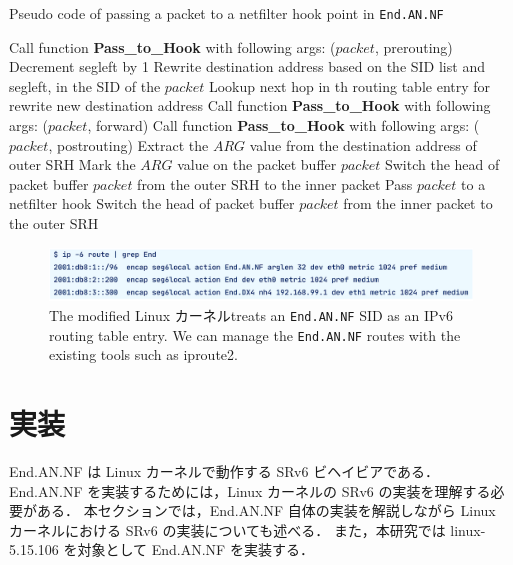   \begin{algorithm*}[t]
    \caption{Pseudo code of passing a packet to a netfilter hook point in \texttt{End.AN.NF}}
    \small
    \label{alg:end-an-nf}
    \begin{algorithmic}[1]
      \State Call function \textbf{Pass\_to\_Hook} with following args: ($packet$, prerouting)
      \State Decrement segleft by 1
      \State Rewrite destination address based on the SID list and segleft, in the SID of the $packet$
      \State Lookup next hop in th routing table entry for rewrite new destination address
      \State Call function \textbf{Pass\_to\_Hook} with following args: ($packet$, forward)
      \State Call function \textbf{Pass\_to\_Hook} with following args: ($packet$, postrouting)
      \EndFunction
      \fi
      \State Extract the $ARG$ value from the destination address of outer SRH
      \State Mark the $ARG$ value on the packet buffer $packet$
      \EndIf
      \State Switch the head of packet buffer $packet$ from the outer SRH to the inner packet
      \State Pass $packet$ to a netfilter hook
      \State Switch the head of packet buffer $packet$ from the inner packet to the outer SRH
      \EndFunction
    \end{algorithmic}
  \end{algorithm*}
  
  \begin{figure}[t]
    \centering
    \includegraphics[width=0.95\linewidth]{img/End-FW-show-route.pdf}
    \caption{The modified Linux カーネルtreats an \texttt{End.AN.NF} SID as an IPv6 routing table entry. We can manage the \texttt{End.AN.NF} routes with the existing tools such as iproute2.}
    \label{fig:show-route}
  \end{figure}

\section{実装}
\label{section:implementation}
End.AN.NF は Linux カーネルで動作する SRv6 ビヘイビアである．
End.AN.NF を実装するためには，Linux カーネルの SRv6 の実装を理解する必要がある．
本セクションでは，End.AN.NF 自体の実装を解説しながら Linux カーネルにおける SRv6 の実装についても述べる．
また，本研究では linux-5.15.106 を対象として End.AN.NF を実装する．

